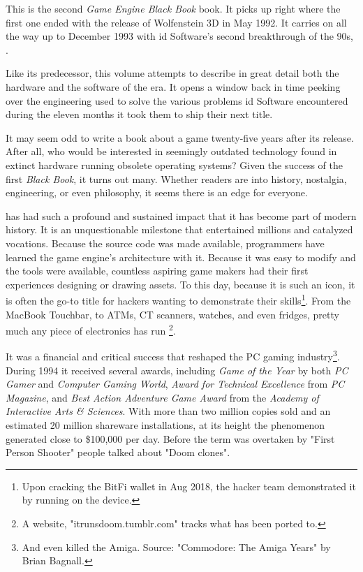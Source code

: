 This is the second \textit{Game Engine Black Book} book. It picks up right where the first one ended with the release of Wolfenstein 3D in May 1992. It carries on all the way up to December 1993 with id Software's second breakthrough of the 90s, \doom{}.\\ %
\par
 Like its predecessor, this volume attempts to describe in great detail both the hardware and the software of the era. It opens a window back in time peeking over the engineering used to solve the various problems id Software encountered during the eleven months it took them to ship their next title.\\%
\par
It may seem odd to write a book about a game twenty-five years after its release. After all, who would be interested in seemingly outdated technology found in extinct hardware running obsolete operating systems? Given the success of the first \textit{Black Book}, it turns out many. Whether readers are into history, nostalgia, engineering, or even philosophy, it seems there is an edge for everyone.\\ 

\par
\doom{} has had such a profound and sustained impact that it has become part of modern history. It is an unquestionable milestone that entertained millions and catalyzed vocations. Because the source code was made available, programmers have learned the game engine's architecture with it. Because it was easy to modify and the tools were available, countless aspiring game makers had their first experiences designing or drawing assets. To this day, because it is such an icon, it is often the go-to title for hackers wanting to demonstrate their skills\footnote{Upon cracking the BitFi wallet in Aug 2018, the hacker team demonstrated it by running \doom{} on the device.}. From the MacBook Touchbar, to ATMs, CT scanners, watches, and even fridges, pretty much any piece of electronics has run \doom{} \footnote{A website, "itrunsdoom{}.tumblr.com" tracks what \doom{} has been ported to.}.\\
\par

It was a financial and critical success that reshaped the PC gaming industry\footnote{And even killed the Amiga. Source: "Commodore: The Amiga Years" by Brian Bagnall.}. During 1994 it received several awards, including \textit{Game of the Year} by both \textit{PC Gamer} and \textit{Computer Gaming World}, \textit{Award for Technical Excellence} from \textit{PC Magazine}, and \textit{Best Action Adventure Game Award} from the \textit{Academy of Interactive Arts \& Sciences}. With more than two million copies sold and an estimated 20 million shareware installations, at its height the phenomenon generated close to \$100,000 per day. Before the term was overtaken by "First Person Shooter" people talked about "Doom clones".\\
\par

